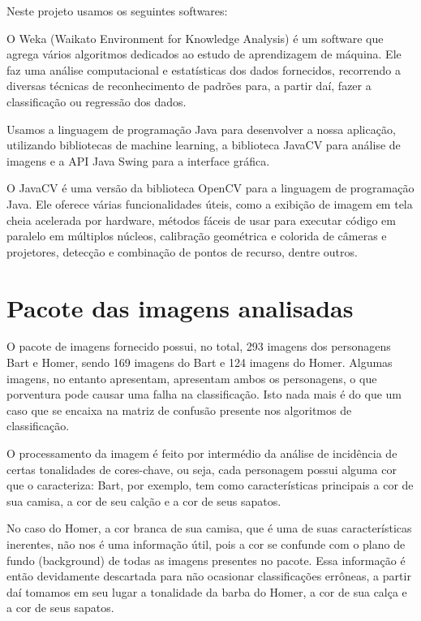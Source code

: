 \documentclass[12pt]{article}
\begin{document}
Neste projeto usamos os seguintes softwares:

\begin{description}[font=$\bullet$~\normalfont\scshape\color{black!50!black}]

\item[weka] O Weka (Waikato Environment for Knowledge Analysis) é um software que agrega vários algoritmos dedicados ao estudo de aprendizagem de máquina. Ele faz uma análise computacional e estatísticas dos dados fornecidos, recorrendo a diversas técnicas de reconhecimento de padrões para, a partir daí, fazer a classificação ou regressão dos dados.
\\
\item[java] Usamos a linguagem de programação Java para desenvolver a nossa aplicação, utilizando bibliotecas de machine learning, a biblioteca JavaCV para análise de imagens e a API Java Swing para a interface gráfica.
\\
\item[javacv] O JavaCV é uma versão da biblioteca OpenCV para a linguagem de programação Java. Ele oferece várias funcionalidades úteis, como a exibição de imagem em tela cheia acelerada por hardware, métodos fáceis de usar para executar código em paralelo em múltiplos núcleos, calibração geométrica e colorida de câmeras e projetores, detecção e combinação de pontos de recurso, dentre outros.

\end{description}


\section{Pacote das imagens analisadas}
O pacote de imagens fornecido possui, no total, 293 imagens dos personagens Bart e Homer, sendo 169 imagens do Bart e 124 imagens do Homer. Algumas imagens, no entanto apresentam, apresentam ambos os personagens, o que porventura pode causar uma falha na classificação. Isto nada mais é do que um caso que se encaixa na matriz de confusão presente nos algoritmos de classificação.

 O processamento da imagem é feito por intermédio da análise de incidência de certas tonalidades de cores-chave, ou seja, cada personagem possui alguma cor que o caracteriza: Bart, por exemplo, tem como características principais a cor de sua camisa, a cor de seu calção e a cor de seus sapatos. 
 
 No caso do Homer, a cor branca de sua camisa, que é uma de suas características inerentes, não nos é uma informação útil, pois a cor se confunde com o plano de fundo (background) de todas as imagens presentes no pacote. Essa informação é então devidamente descartada para não ocasionar classificações errôneas, a partir daí tomamos em seu lugar a tonalidade da barba do Homer, a cor de sua calça e a cor de seus sapatos.
\end{document}
